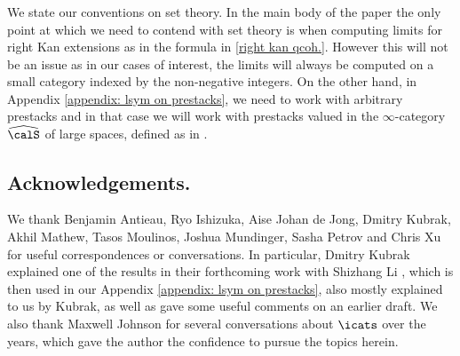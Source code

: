 \documentclass[10pt,reqno]{amsart}
\numberwithin{equation}{section}
\newcommand{\cF}{\mathcal{F}}
\newcommand{\spec}{{\mathrm{Spec}}}
\newcommand{\Qcoh}{\mathrm{QCoh}}
\begin{document}


\subsubsection{}\label{set theory} We state our conventions on set theory. In the main body of the paper the only point at which we need to contend with set theory is when computing limits for right Kan extensions as in the formula in \ref{right kan qcoh.}. However this will not be an issue as in our cases of interest, the limits will always be computed on a small category indexed by the non-negative integers. On the other hand, in Appendix \ref{appendix: lsym on prestacks}, we need to work with arbitrary prestacks and in that case we will work with prestacks valued in the $\infty$-category $\widehat{\calS}$ of large spaces, defined as in \cite[Remark 1.2.16.4]{HTT}.





\subsection{Acknowledgements.}

We thank Benjamin Antieau, Ryo Ishizuka, Aise Johan de Jong, Dmitry Kubrak, Akhil Mathew, Tasos Moulinos, Joshua Mundinger, Sasha Petrov and Chris Xu for useful correspondences or conversations.
In particular, Dmitry Kubrak explained one of the results in their forthcoming work with Shizhang Li \cite{KubrakLiKGn_inprep}, which is then used in our Appendix \ref{appendix: lsym on prestacks}, also mostly explained to us by Kubrak, as well as gave some useful comments on an earlier draft.
We also thank Maxwell Johnson for several conversations about $\icats$ over the years, which gave the author the confidence to pursue the topics herein.
\end{document}
